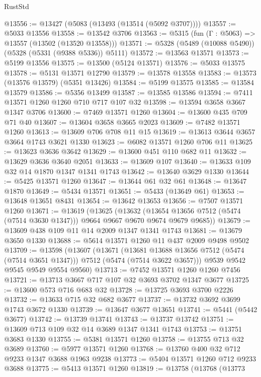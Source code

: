 \begin{lexlean}{RustStd}
\begin{coremodule}
@13556 := @13427 (@5083 (@13493 (@13514 (@5092 @3707))))
@13557 := @5033 @13556
@13558 := @13542 @3706
@13563 := @5315 (fun (Γ : @5063) => @13557 (@13502 (@13520 @13558)))
@13571 := @5328 (@5489 (@10088 @5490)) (@5328 (@5331 (@9388 @5336)) @5111)
@13572 := @13563 @13571
@13573 := @5199 @13556
@13575 := @13500 (@5124 @13571)
@13576 := @5033 @13575
@13578 := @5131 @13571 @12790
@13579 := @13578 @13558
@13583 := @13573 (@13576 @13579) (@5351 @13426)
@13584 := @5199 @13575
@13585 := @13584 @13579
@13586 := @5356 @13499
@13587 := @13585 @13586
@13594 := @7411 @13571 @1260 @1260 @710 @717 @107 @32
@13598 := @13594 @3658 @3667 @1347 @3706
@13600 := @7469 @13571 @1260
@13604 := @13600 @435 @709 @71 @40
@13607 := @13604 @3658 @3665 @2023
@13609 := @7482 @13571 @1260
@13613 := @13609 @706 @708 @11 @15
@13619 := @13613 @3644 @3657 @3664 @1743 @3621 @1330
@13623 := @6082 @13571 @1260 @706 @11
@13625 := @13623 @3636 @3642
@13629 := @13600 @451 @110 @682 @11
@13632 := @13629 @3636 @3640 @2051
@13633 := @13609 @107
@13640 := @13633 @109 @32 @14 @1870 @1347 @1341 @1743
@13642 := @13640 @3629 @1330
@13644 := @5425 @13571 @1260
@13647 := @13644 @61 @32 @61
@13648 := @13647 @1870
@13649 := @5434 @13571
@13651 := @5433 (@13649 @61)
@13653 := @13648 @13651 @8431
@13654 := @13642 @13653
@13656 := @7507 @13571 @1260
@13671 := @13619
    (@13625
      (@13632
        (@13654 @13656 @7512 (@5474 (@7514 @3630 @1347)))
        @9664
        @9667
        @9670
        @9674
        @9679
        @9685))
@13679 := @13609 @438 @109 @11 @14 @2009 @1347 @1341 @1743
@13681 := @13679 @3650 @1330
@13688 := @5614 @13571 @1260 @11 @437 @2009 @9498 @9502
@13709 := @13598
    (@13607
      (@13671
        (@13681 @13688 @13656 @7512 (@5474 (@7514 @3651 @1347)))
        @7512
        (@5474 (@7514 @3622 @3657)))
      @9539
      @9542
      @9545
      @9549
      @9554
      @9560)
@13713 := @7452 @13571 @1260 @1260 @7456
@13721 := @13713 @3667 @717 @107 @32 @3693 @3702 @1347 @3677
@13725 := @13600 @573 @716 @683 @32
@13728 := @13725 @3693 @3700 @2226
@13732 := @13633 @715 @32 @682 @3677
@13737 := @13732 @3692 @3699 @1743 @3672 @1330
@13739 := @13647 @3677 @13651
@13741 := @5441 (@5442 @3677)
@13742 := @13739 @13741
@13743 := @13737 @13742
@13751 := @13609 @713 @109 @32 @14 @3689 @1347 @1341 @1743
@13753 := @13751 @3683 @1330
@13755 := @5381 @13571 @1260
@13758 := @13755 @713 @32 @3689
@13760 := @5977 @13571 @1260
@13768 := @13760 @400 @32 @712 @9233 @1347 @3688 @1963 @9238
@13773 := @5404 @13571 @1260 @712 @9233 @3688
@13775 := @5413 @13571 @1260
@13819 := @13758
    (@13768
      (@13773

\end{coremodule}
\end{lexlean}
